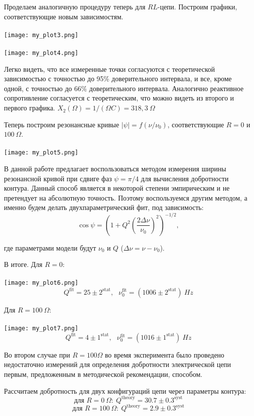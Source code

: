 Проделаем аналогичную процедуру теперь для $RL$-цепи. Построим графики, соответствующие новым зависимостям.\\
\\
\texttt{[image: my\_plot3.png]}\\
\\
\texttt{[image: my\_plot4.png]}

Легко видеть, что все измеренные точки согласуются с теоретической зависимостью с точностью до 95\% доверительного интервала, и все, кроме одной, с точностью до 66\% доверительного интервала. Аналогично реактивное сопротивление согласуется с теоретическим, что можно видеть из второго и первого графика. $X_2(\Omega) = 1/(\Omega C) = 318,3~\Omega$

Теперь построим резонансные кривые $|\psi| = f(\nu/\nu_0)$, соответствующие $R=0$ и $100~\Omega$. \\
\\
\texttt{[image: my\_plot5.png]}

В данной работе предлагает воспользоваться методом измерения ширины резонансной кривой при сдвиге фаз $\psi = \pi/4$ для вычисления добротности контура. Данный способ является в некоторой степени эмпирическим и не претендует на абсолютную точность. Поэтому воспользуемся другим методом, а именно будем делать двухпараметрический фит, под зависимость:
$$ \cos{\psi} = \left(1 + Q^2 \left(\frac{2\Delta \nu}{\nu_0}\right)^2\right)^{-1/2},$$

где параметрами модели будут $\nu_0$ и $Q$ ($\Delta \nu = \nu - \nu_0$).

В итоге. Для $R=0$:\\
\\
\texttt{[image: my\_plot6.png]}
$$\boxed{Q^{\text{fit}} = 25 \pm 2^{\text{stat}},~~~\nu_0^{\text{fit}} = (1006 \pm 2^{\text{stat}})~Hz}$$

Для $R=100~\Omega$:\\
\\
\texttt{[image: my\_plot7.png]}
$$\boxed{Q^{\text{fit}} = 4 \pm 1^{\text{stat}},~~~\nu_0^{\text{fit}} = (1016 \pm 1^{\text{stat}})~Hz}$$

Во втором случае при $R=100 \Omega$ во время эксперимента было проведено недостаточно измерений для определения добротности электрической цепи первым, предложенным в методической рекомендации, способом.

Рассчитаем добротность для двух конфигураций цепи через параметры контура:
$$\text{для~}R=0~\Omega:~Q^{\text{theory}} = 30.7 \pm 0.3^{\text{syst}}$$ $$\text{для~}R=100~\Omega:~Q^{\text{theory}} = 2.9 \pm 0.3^{\text{syst}}$$

